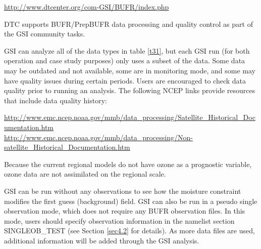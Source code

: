 \begin{center}
\url{http://www.dtcenter.org/com-GSI/BUFR/index.php}
\end{center}

DTC supports BUFR/PrepBUFR data processing and quality control as part of the GSI community tasks.

GSI can analyze all of the data types in table \ref{t31}, but each GSI run (for both operation and case study purposes) only uses a subset of the data. Some data may be outdated and not available, some are in monitoring mode, and some may have quality issues during certain periods. Users are encouraged to check data quality prior to running an analysis. The following NCEP links provide resources that include data quality history:

\begin{center}
\begin{scriptsize}
\url{http://www.emc.ncep.noaa.gov/mmb/data_processing/Satellite_Historical_Documentation.htm}
\\
\url{http://www.emc.ncep.noaa.gov/mmb/data_processing/Non-satellite_Historical_Documentation.htm}
\end{scriptsize}
\end{center}

Because the current regional models do not have ozone as a prognostic variable, ozone data are not assimilated on the regional scale.

GSI can be run without any observations to see how the moisture constraint modifies the first guess (background) field. GSI can also be run in a pseudo single observation mode, which does not require any BUFR observation files. In this mode, users should specify observation information in the namelist section SINGLEOB\_TEST (see Section \ref{sec4.2} for details). As more data files are used, additional information will be added through the GSI analysis.

